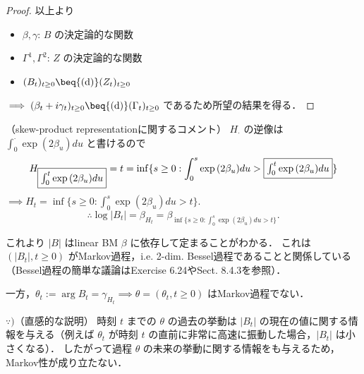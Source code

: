 \documentclass{jsarticle}
\begin{document}
\begin{proof}
    以上より
    \begin{itemize}
        \item 
        $\beta, \gamma$: $B$ の決定論的な関数
        \item 
        $\Gamma^1, \Gamma^2$: $Z$ の決定論的な関数
        \item 
        $(B_t)_{t\ge0}\beq{\text{(d)}}(Z_t)_{t\ge0}$
    \end{itemize}

    $\implies (\beta_t+i\gamma_t)_{t\ge0}\beq{\text{(d)}}(\Gamma_t)_{t\ge0}$ であるため所望の結果を得る．
\end{proof}

（skew-product representationに関するコメント）
$H_{\cdot}$ の逆像は $\int_0^{\cdot}\exp{(2\beta_u)}du$ と書けるので
\begin{align}
    H_{\fbox{$\int_0^t\exp{(2\beta_u)}du$}}
    = t
    = \inf\{s\ge0:\int_0^s\exp{(2\beta_u)}du>\fbox{$\int_0^t\exp{(2\beta_u)}du$}\}
\end{align}
$\implies H_t = \inf\{s\ge0:\int_0^s\exp{(2\beta_u)}du>t\}.$
$$
\therefore 
\log{\lvert B_t\rvert}
= \beta_{H_t}
= \beta_{\inf\{s\ge0:\int_0^s\exp{(2\beta_u)}du>t\}}.
$$

これより $\lvert B\rvert$ はlinear BM $\beta$ に依存して定まることがわかる．
これは $(\lvert B_t\rvert, t\ge0)$ がMarkov過程，i.e. 2-dim. Bessel過程であることと関係している（Bessel過程の簡単な議論はExercise 6.24やSect. 8.4.3を参照）．

一方，$\theta_t:=\arg B_t=\gamma_{H_t}\implies \theta=(\theta_t, t\ge0)$ はMarkov過程でない．

\begin{screen}
    $\because)$（直感的な説明）
    時刻 $t$ までの $\theta$ の過去の挙動は $\lvert B_t\rvert$ の現在の値に関する情報を与える（例えば $\theta_t$ が時刻 $t$ の直前に非常に高速に振動した場合，$\lvert B_t\rvert$ は小さくなる）\nazo．
    したがって過程 $\theta$ の未来の挙動に関する情報をも与えるため，Markov性が成り立たない．
\end{screen}
\end{document}

